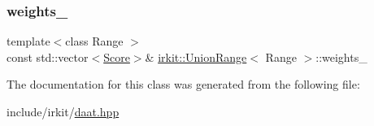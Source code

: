 \mbox{\label{classirkit_1_1UnionRange_a0c53eb9b1c9e8aa18621f4c129a6ff90}} 
\subsubsection{\texorpdfstring{weights\+\_\+}{weights\_}}
{\footnotesize\ttfamily template$<$class Range $>$ \\
const std\+::vector$<$\mbox{\hyperlink{classirkit_1_1UnionRange_a47fb098a85581f5e33f4203e16245dae}{Score}}$>$\& \mbox{\hyperlink{classirkit_1_1UnionRange}{irkit\+::\+Union\+Range}}$<$ Range $>$\+::weights\+\_\+\hspace{0.3cm}{\ttfamily [protected]}}



The documentation for this class was generated from the following file\+:\begin{DoxyCompactItemize}
\item 
include/irkit/\mbox{\hyperlink{daat_8hpp}{daat.\+hpp}}\end{DoxyCompactItemize}
